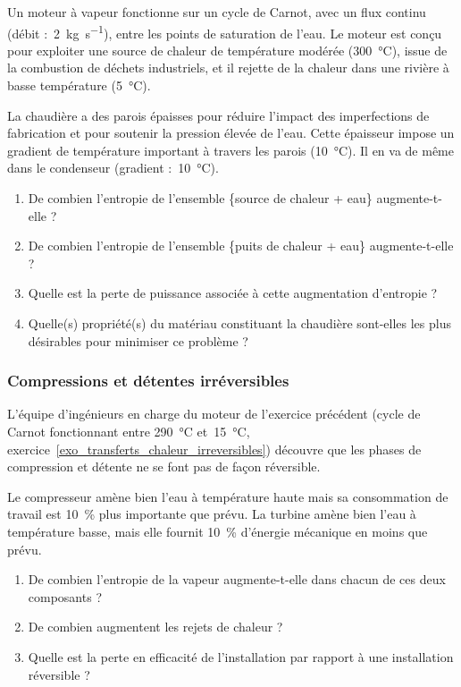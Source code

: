 	Un moteur à vapeur fonctionne sur un cycle de Carnot, avec un flux continu (débit :~\SI{2}{\kilogram\per\second}), entre les points de saturation de l’eau. Le moteur est conçu pour exploiter une source de chaleur de température modérée (\SI{300}{\degreeCelsius}), issue de la combustion de déchets industriels, et il rejette de la chaleur dans une rivière à basse température (\SI{5}{\degreeCelsius}).

	La chaudière a des parois épaisses pour réduire l’impact des imperfections de fabrication et pour soutenir la pression élevée de l’eau. Cette épaisseur impose un gradient de température important à travers les parois (\SI{10}{\degreeCelsius}). Il en va de même dans le condenseur (gradient :~\SI{10}{\degreeCelsius}).

	\begin{enumerate}
		\item De combien l’entropie de l’ensemble \{source de chaleur + eau\} augmente-t-elle ?
		\item De combien l’entropie de l’ensemble \{puits de chaleur + eau\} augmente-t-elle ?
		\item Quelle est la perte de puissance associée à cette augmentation d’entropie ?
		\item Quelle(s) propriété(s) du matériau constituant la chaudière sont-elles les plus désirables pour minimiser ce problème ?
	\end{enumerate}


\subsubsection{Compressions et détentes irréversibles}
\label{exo_compressions_detentes_irreversibles}

	L’équipe d’ingénieurs en charge du moteur de l’exercice précédent (cycle de Carnot fonctionnant entre \SI{290}{\degreeCelsius} et~\SI{15}{\degreeCelsius}, exercice~\ref{exo_transferts_chaleur_irreversibles}) découvre que les phases de compression et détente ne se font pas de façon réversible.

	Le compresseur amène bien l’eau à température haute mais sa consommation de travail est \SI{10}{\percent} plus importante que prévu. La turbine amène bien l’eau à température basse, mais elle fournit \SI{10}{\percent} d’énergie mécanique en moins que prévu.
	
	\begin{enumerate}
		\item De combien l’entropie de la vapeur augmente-t-elle dans chacun de ces deux composants ?
		\item De combien augmentent les rejets de chaleur ?
		\item Quelle est la perte en efficacité de l’installation par rapport à une installation réversible ?
	\end{enumerate}



